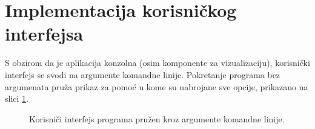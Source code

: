 \section{Implementacija korisničkog interfejsa}
\label{sec:ImplementationUI}

S obzirom da je aplikacija konzolna (osim komponente za vizualizaciju), korisnički interfejs se svodi na argumente komandne linije. Pokretanje programa bez argumenata pruža prikaz za pomoć u kome su nabrojane sve opcije, prikazano na slici \ref{fig:UIImpl}.

\begin{figure}[h!]
\centering
\caption{Korisniči interfejs programa pružen kroz argumente komandne linije.}
\label{fig:UIImpl}
\end{figure}
